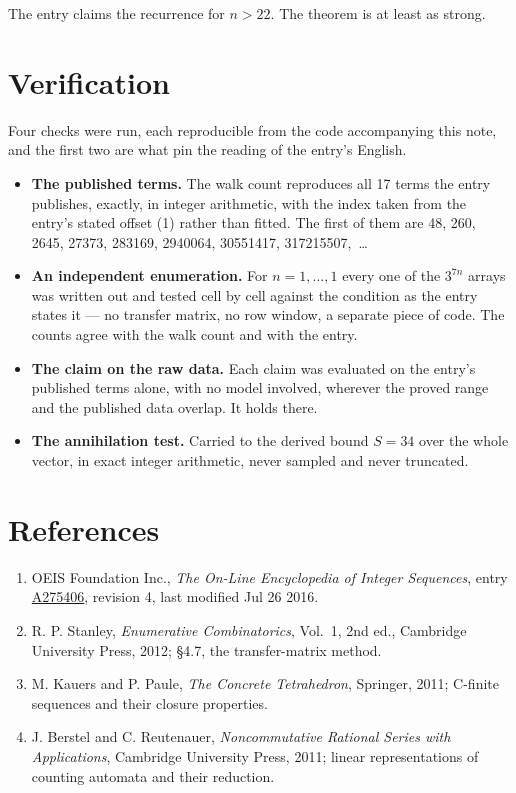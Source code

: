 \documentclass[11pt]{article}
\theoremstyle{definition}
\begin{document}
The entry claims the recurrence for $n > 22$. The theorem is at least as strong.

\section{Verification}

Four checks were run, each reproducible from the code accompanying this note, and the first two are what pin the reading of the entry's English.

\begin{itemize}

\item {\bfseries The published terms.} The walk count reproduces all 17 terms the entry publishes, exactly, in integer arithmetic, with the index taken from the entry's stated offset (1) rather than fitted. The first of them are 48, 260, 2645, 27373, 283169, 2940064, 30551417, 317215507,~\dots

\item {\bfseries An independent enumeration.} For $n = 1,\dots,1$ every one of the $3^{7n}$ arrays was written out and tested cell by cell against the condition as the entry states it --- no transfer matrix, no row window, a separate piece of code. The counts agree with the walk count and with the entry.

\item {\bfseries The claim on the raw data.} Each claim was evaluated on the entry's published terms alone, with no model involved, wherever the proved range and the published data overlap. It holds there.

\item {\bfseries The annihilation test.} Carried to the derived bound $S = 34$ over the whole vector, in exact integer arithmetic, never sampled and never truncated.

\end{itemize}

\section{References}

\begin{enumerate}

\item OEIS Foundation Inc., \emph{The On-Line Encyclopedia of Integer Sequences}, entry \href{https://oeis.org/A275406}{A275406}, revision 4, last modified Jul 26 2016.

\item R. P. Stanley, \emph{Enumerative Combinatorics}, Vol.~1, 2nd ed., Cambridge University Press, 2012; \S4.7, the transfer-matrix method.

\item M. Kauers and P. Paule, \emph{The Concrete Tetrahedron}, Springer, 2011; C-finite sequences and their closure properties.

\item J. Berstel and C. Reutenauer, \emph{Noncommutative Rational Series with Applications}, Cambridge University Press, 2011; linear representations of counting automata and their reduction.

\end{enumerate}
\end{document}
